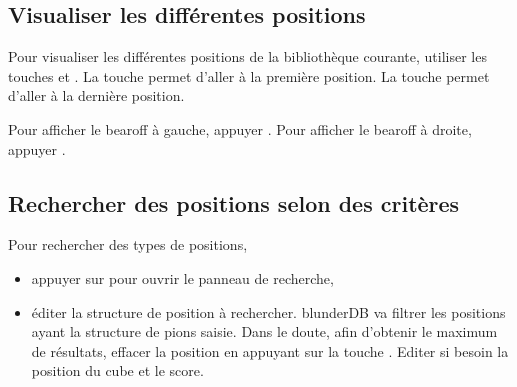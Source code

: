 \documentclass[letterpaper,10pt,french]{sphinxmanual}
\begin{document}
\subsection{Visualiser les différentes positions}
\label{\detokenize{guide_utilisateur:visualiser-les-differentes-positions}}
\sphinxAtStartPar
Pour visualiser les différentes positions de la bibliothèque courante, utiliser
les touches  et . La touche  permet d’aller à la première
position. La touche  permet d’aller à la dernière position.

\sphinxAtStartPar
Pour afficher le bearoff à gauche, appuyer . Pour afficher le
bearoff à droite, appuyer .


\subsection{Rechercher des positions selon des critères}
\label{\detokenize{guide_utilisateur:rechercher-des-positions-selon-des-criteres}}
\sphinxAtStartPar
Pour rechercher des types de positions,
\begin{itemize}
\item {} 
\sphinxAtStartPar
appuyer sur  pour ouvrir le panneau de recherche,

\item {} 
\sphinxAtStartPar
éditer la structure de position à rechercher. blunderDB va filtrer les
positions ayant  la structure de pions saisie. Dans le
doute, afin d’obtenir le maximum de résultats, effacer la position
en appuyant sur la touche . Editer si besoin la
position du cube et le score.

\end{itemize}
\end{document}
